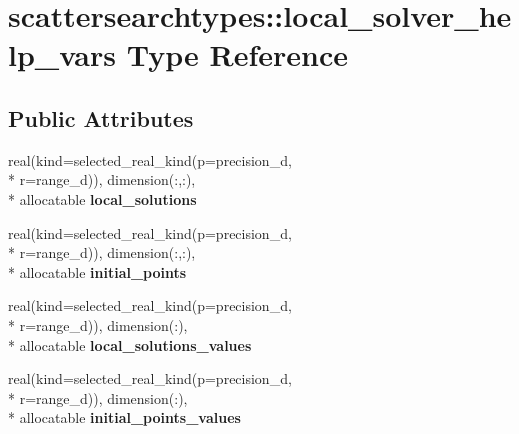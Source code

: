 \hypertarget{structscattersearchtypes_1_1local__solver__help__vars}{\section{scattersearchtypes\-:\-:local\-\_\-solver\-\_\-help\-\_\-vars Type Reference}
\label{structscattersearchtypes_1_1local__solver__help__vars}
}
\subsection*{Public Attributes}
\begin{DoxyCompactItemize}
\item 
\hypertarget{structscattersearchtypes_1_1local__solver__help__vars_a024e025101d6bf157ab5553d4be9119e}{real(kind=selected\-\_\-real\-\_\-kind(p=precision\-\_\-d, \\*
r=range\-\_\-d)), dimension(\-:,\-:), \\*
allocatable {\bfseries local\-\_\-solutions}}\label{structscattersearchtypes_1_1local__solver__help__vars_a024e025101d6bf157ab5553d4be9119e}

\item 
\hypertarget{structscattersearchtypes_1_1local__solver__help__vars_a6a23a23808eb63f078f618432387961d}{real(kind=selected\-\_\-real\-\_\-kind(p=precision\-\_\-d, \\*
r=range\-\_\-d)), dimension(\-:,\-:), \\*
allocatable {\bfseries initial\-\_\-points}}\label{structscattersearchtypes_1_1local__solver__help__vars_a6a23a23808eb63f078f618432387961d}

\item 
\hypertarget{structscattersearchtypes_1_1local__solver__help__vars_aa4622aac8d8f8a9b33d57937df9fea78}{real(kind=selected\-\_\-real\-\_\-kind(p=precision\-\_\-d, \\*
r=range\-\_\-d)), dimension(\-:), \\*
allocatable {\bfseries local\-\_\-solutions\-\_\-values}}\label{structscattersearchtypes_1_1local__solver__help__vars_aa4622aac8d8f8a9b33d57937df9fea78}

\item 
\hypertarget{structscattersearchtypes_1_1local__solver__help__vars_aebab77bb46106f4f45662f5f42c01ec2}{real(kind=selected\-\_\-real\-\_\-kind(p=precision\-\_\-d, \\*
r=range\-\_\-d)), dimension(\-:), \\*
allocatable {\bfseries initial\-\_\-points\-\_\-values}}\label{structscattersearchtypes_1_1local__solver__help__vars_aebab77bb46106f4f45662f5f42c01ec2}


\end{DoxyCompactItemize}
